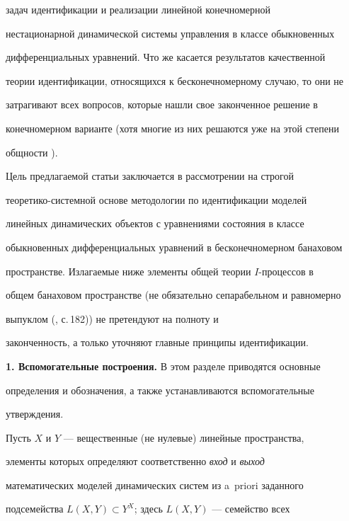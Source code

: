задач идентификации и реализации \cite{10} линейной конечномерной 


нестационарной динамической системы управления в классе обыкновенных 


дифференциальных уравнений. Что же касается результатов качественной 


теории идентификации, относящихся к бесконечномерному случаю, то они не 


затрагивают всех вопросов, которые нашли свое законченное решение в 


конечномерном варианте (хотя многие из них решаются уже на этой степени 


общности \cite{11}). 


 


Цель предлагаемой статьи заключается в рассмотрении на строгой 


теоретико-системной основе методологии по идентификации моделей 


линейных динамических объектов с уравнениями состояния в классе 


обыкновенных дифференциальных уравнений в бесконечномерном банаховом 


пространстве. Излагаемые ниже элементы общей теории $I$-процессов в 


общем банаховом пространстве (не обязательно сепарабельном и равномерно 


выпуклом (\cite{12}, с.\,182)) не претендуют на полноту и 


законченность, а только уточняют главные принципы идентификации. 


\medskip 


 


{\bf 1. Вспомогательные построения.} В этом разделе приводятся основные 


определения и обозначения, а также устанавливаются вспомогательные 


утверждения. 


 


Пусть $X$ и $Y$ --- вещественные (не нулевые) линейные пространства, 


элементы которых определяют соответственно {\it вход} и {\it выход} 


математических моделей динамических систем из a~priori заданного 


подсемейства $L(X,Y)\subset Y^X$; здесь $L(X,Y)$ --- семейство всех 


